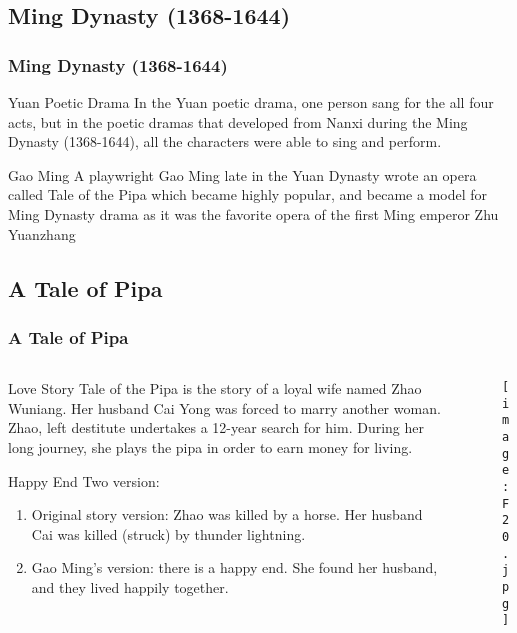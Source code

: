 \documentclass[pdflatex,compress,8pt,
	xcolor={dvipsnames,dvipsnames,svgnames,x11names,table},
	hyperref={	
	breaklinks = true, 
	pdfauthor={Lemenkova Polina}, 
	pdfsubject={Preentation}, 
	pdfcreator={Lemenkova Polina}, 
	pdfproducer={Lemenkova Polina}, 
	colorlinks=true,
	linkcolor=NavyBlue, 
	citecolor=NavyBlue, 
	urlcolor = NavyBlue, 
	breaklinks = true}]{beamer}
\begin{document}
\subsection{Ming Dynasty (1368-1644)}
\begin{frame}\frametitle{Ming Dynasty (1368-1644)}
	\begin{alertblock}{Yuan Poetic Drama}
	In the Yuan poetic drama, one person sang for the all four acts, but in the poetic dramas that developed from Nanxi during the Ming Dynasty (1368-1644), all the characters were able to sing and perform.
	\end{alertblock}
	
	\begin{block}{Gao Ming}
	A playwright Gao Ming late in the Yuan Dynasty wrote an opera called Tale of the Pipa which became highly popular, and became a model for Ming Dynasty drama as it was the favorite opera of the first Ming
emperor Zhu Yuanzhang
	\end{block}
\end{frame}

\subsection{A Tale of Pipa}
\begin{frame}\frametitle{A Tale of Pipa}
	\begin{minipage}[0.4\textheight]{\textwidth}
		\begin{columns}[T]
		\begin{column}{0.5\textwidth}

	\begin{block}{Love Story}
	Tale of the Pipa is the story of a loyal wife named Zhao Wuniang. Her husband Cai Yong was forced to marry another woman. Zhao, left destitute undertakes a 12-year search for him. During her long journey, she plays the pipa in order to earn money for living.
	\end{block}

	\begin{alertblock}{Happy End}
	Two version: 
		\begin{enumerate}
			\item Original story version: Zhao was killed by a horse. Her husband Cai was killed (struck) by thunder lightning. 
			\item Gao Ming's version: there is a happy end. She found her husband, and they lived happily together.
		\end{enumerate}	
	\end{alertblock}
		\end{column}
			\begin{column}{0.5\textwidth}
				\vspace{2em}
				\begin{figure}[H]
					\centering
						\texttt{[image: F20.jpg]}
				\end{figure}
			\end{column}
		\end{columns}
	\end{minipage}
\end{frame}
\end{document}
